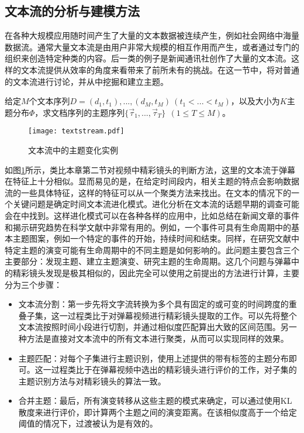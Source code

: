 \subsection{文本流的分析与建模方法}
在各种大规模应用随时间产生了大量的文本数据被连续产生，例如社会网络中海量数据流。通常大量文本流是由用户非常大规模的相互作用而产生，或者通过专门的组织来创造特定种类的内容。后一类的例子是新闻通讯社创作了大量的文本流。这样的文本流提供从效率的角度来看带来了前所未有的挑战。在这一节中，将对普通的文本流进行讨论，并从中挖掘和建立主题。

\begin{mydef}[文本流的主题识别问题]
  给定$M$个文本序列$D={(d_1,t_1),...,(d_M,t_M)}~(t_1<...<t_M)$，以及大小为$K$主题分布$\Phi$，求文档序列的主题序列$\{\vec{\tau}_1,...,\vec{\tau}_T\}~~(1\le T\le M)$。
\end{mydef}

\begin{figure}
\centering
\texttt{[image: textstream.pdf]}
\caption{文本流中的主题变化实例}
\label{fig:textstream}
\end{figure}

如图\ref{fig:textstream}所示，类比本章第二节对视频中精彩镜头的判断方法，这里的文本流于弹幕在特征上十分相似。显而易见的是，在给定时间段内，相关主题的特点会影响数据流的一些具体特征，这样的特征可以从一个聚类方法来找出。在文本的情况下的一个关键问题是确定时间文本流进化模式。进化分析在文本流的话题早期的调查可能会在\cite{kontostathis2004survey}中找到。这样进化模式可以在各种各样的应用中，比如总结在新闻文章的事件和揭示研究趋势在科学文献中非常有用的。例如，一个事件可具有生命周期中的基本主题图案，例如一个特定的事件的开始，持续时间和结束。同样，在研究文献中特定主题的演变可能有生命周期中的不同主题是如何影响的。此问题主要包含三个主要部分：发现主题、建立主题演变、研究主题的生命周期。这几个问题与弹幕中的精彩镜头发现是极其相似的，因此完全可以使用之前提出的方法进行计算，主要分为三个步骤：
\begin{itemize}
  \item 文本流分割：第一步先将文字流转换为多个具有固定的或可变的时间跨度的重叠子集，这一过程类比于对弹幕视频进行精彩镜头提取的工作。可以先将整个文本流按照时间小段进行切割，并通过相似度匹配算出大致的区间范围。另一种方法是直接对文本流中的所有文本进行聚类，从而可以实现同样的效果。
  \item 主题匹配：对每个子集进行主题识别，使用上述提供的带有标签的主题分布即可。这一过程类比于在弹幕视频中选出的精彩镜头进行评价的工作，对子集的主题识别方法与对精彩镜头的算法一致。
  \item 合并主题：最后，所有演变转移从这些主题的模式来确定，可以通过使用KL散度来进行评价，即计算两个主题之间的演变距离。在该相似度高于一个给定阈值的情况下，过渡被认为是有效的。
\end{itemize}

